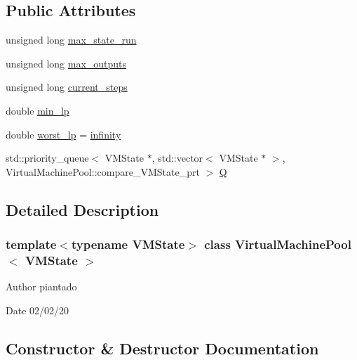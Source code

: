 \subsection*{Public Attributes}
\begin{DoxyCompactItemize}
\item 
unsigned long \hyperlink{class_virtual_machine_pool_ac64fb33b9ff42650839f8b10f2b11a4a}{max\+\_\+state\+\_\+run}
\item 
unsigned long \hyperlink{class_virtual_machine_pool_a042d1b151817c99638f8b35303eb508f}{max\+\_\+outputs}
\item 
unsigned long \hyperlink{class_virtual_machine_pool_a63db532386cd929a09525f7ab569ff81}{current\+\_\+steps}
\item 
double \hyperlink{class_virtual_machine_pool_adef21b421dc051008ba0bd4ee59a3809}{min\+\_\+lp}
\item 
double \hyperlink{class_virtual_machine_pool_ac5ffa14dc0e298c9fae3cddfa04779bb}{worst\+\_\+lp} = \hyperlink{_numerics_8h_a1bb1e42ae1b40cad6e99da0aab8a5576}{infinity}
\item 
std\+::priority\+\_\+queue$<$ V\+M\+State $\ast$, std\+::vector$<$ V\+M\+State $\ast$ $>$, Virtual\+Machine\+Pool\+::compare\+\_\+\+V\+M\+State\+\_\+prt $>$ \hyperlink{class_virtual_machine_pool_a6bb6ec72e4b6fb87bb3b7ea6eb0e4d6e}{Q}
\end{DoxyCompactItemize}


\subsection{Detailed Description}
\subsubsection*{template$<$typename V\+M\+State$>$\newline
class Virtual\+Machine\+Pool$<$ V\+M\+State $>$}

\begin{DoxyAuthor}{Author}
piantado 
\end{DoxyAuthor}
\begin{DoxyDate}{Date}
02/02/20 
\end{DoxyDate}


\subsection{Constructor \& Destructor Documentation}
\mbox{\label{class_virtual_machine_pool_a2187554e3a4fd48ebe7ea6712e161e01}} 
